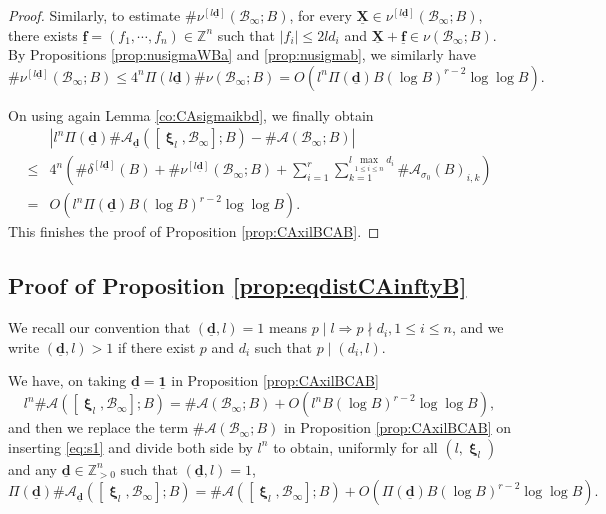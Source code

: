 \documentclass[11pt,letterpaper]{amsart}
\newcommand{\BZ}{{\mathbb {Z}}}
\newcommand{\CA}{{\mathcal {A}}}
\newcommand{\CB}{{\mathcal {B}}}
\newcommand{\XX}{\underline{\mathbf{X}}}
\newcommand{\dd}{\underline{\mathbf{d}}}
\newcommand{\ff}{\underline{\mathbf{f}}}
\DeclareMathOperator{\bxi}{\mathbf{\xi}}
\theoremstyle{plain}
\numberwithin{equation}{section}
\theoremstyle{definition}
\theoremstyle{remark}
\begin{document}
\begin{proof}
	Similarly, to estimate $\#\nu^{[l\dd]}(\CB_\infty;B)$, for every $\XX\in\nu^{[l\dd]}(\CB_\infty;B)$, there exists $\ff=(f_1,\cdots,f_n)\in\BZ^n$ such that $|f_i|\leqslant 2ld_i$ and $\XX+\ff\in \nu(\CB_\infty;B)$. By Propositions \ref{prop:nusigmaWBa} and \ref{prop:nusigmab}, we similarly have
	$$\#\nu^{[l\dd]}(\CB_\infty;B)\leqslant 4^n \Pi(l\dd)\#\nu(\CB_\infty;B)=O(l^n\Pi(\dd)B(\log B)^{r-2}\log\log B).$$
	
	On using again Lemma \ref{co:CAsigmaikbd}, we finally obtain
	\begin{align*}
		&\left|l^n\Pi(\dd)\#\CA_{\dd}([\bxi_l,\CB_\infty];B)-\#\CA(\CB_\infty;B)\right|\\ \leqslant &4^n\left(\#\delta^{[l\dd]}(B)+\#\nu^{[l\dd]}(\CB_\infty;B)+\sum_{i=1}^{r}\sum_{k=1}^{l\max_{1\leqslant i\leqslant n} d_i}\#\CA_{\sigma_0}(B)_{i,k}\right)\\ =&O(l^n\Pi(\dd)B(\log B)^{r-2}\log\log B).
	\end{align*}
	This finishes the proof of Proposition \ref{prop:CAxilBCAB}. 
\end{proof}

\subsection{Proof of Proposition \ref{prop:eqdistCAinftyB}}
	We recall our convention that $(\dd,l)=1$ means $p\mid l\Rightarrow p\nmid d_i,1\leqslant i\leqslant n$, and we write $(\dd,l)>1$ if there exist $p$ and $d_i$ such that $p\mid (d_i,l)$.
	
	We have, on taking $\dd=\underline{\mathbf{1}}$ in Proposition  \ref{prop:CAxilBCAB} \begin{equation}\label{eq:s1}
		l^n\#\CA([\bxi_l,\CB_\infty];B)=\#\CA(\CB_\infty;B)+O(l^n B(\log B)^{r-2}\log\log B),
	\end{equation} and then we replace the term $\#\CA(\CB_\infty;B)$ in Proposition \ref{prop:CAxilBCAB} on inserting \eqref{eq:s1} and divide both side by $l^n$ to obtain, uniformly for all $(l,\bxi_l)$ and any $\dd\in\BZ_{>0}^n$ such that $(\dd,l)=1$,
	\begin{equation}\label{eq:s2}
		\Pi(\dd)\#\CA_{\dd}([\bxi_l,\CB_\infty];B)=\#\CA([\bxi_l,\CB_\infty];B)+O(\Pi(\dd) B(\log B)^{r-2}\log\log B).
	\end{equation}
	
\end{document}
